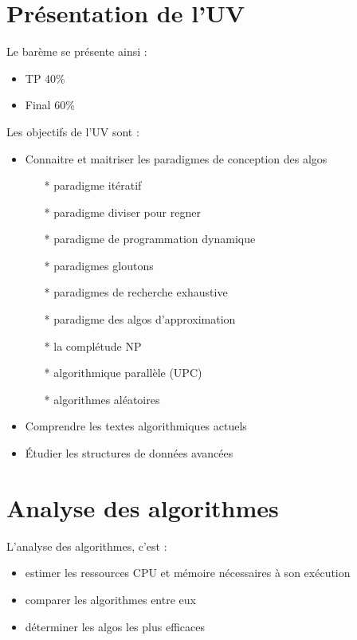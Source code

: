 \chapter*{Présentation de l'UV}

Le barème se présente ainsi :
\begin{itemize}
\item TP 40\%
\item Final 60\%
\end{itemize}
\vspace*{2ex}

\indent Les objectifs de l'UV sont :
\begin{itemize}
  \item Connaitre et maitriser les paradigmes de conception des algos
    \begin{itemize}
      \item[*] paradigme itératif
      \item[*] paradigme diviser pour regner
      \item[*] paradigme de programmation dynamique
      \item[*] paradigmes gloutons
      \item[*] paradigmes de recherche exhaustive
      \item[*] paradigme des algos d'approximation
      \item[*] la complétude NP
      \item[*] algorithmique parallèle (UPC)
      \item[*] algorithmes aléatoires
    \end{itemize}
  \item Comprendre les textes algorithmiques actuels
  \item Étudier les structures de données avancées
\end{itemize}

\chapter{Analyse des algorithmes}
L'analyse des algorithmes, c'est :
\begin{itemize}
  \item estimer les ressources CPU et mémoire nécessaires à son exécution
  \item comparer les algorithmes entre eux
  \item déterminer les algos les plus efficaces
\end{itemize}

